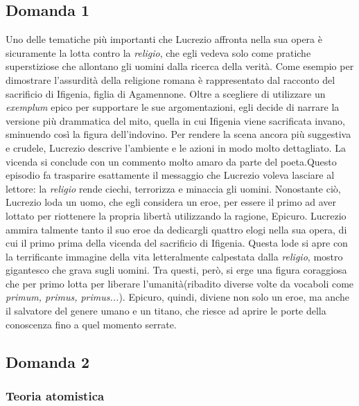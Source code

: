\documentclass[10pt,a4paper]{article}
\begin{document}
	\subsection{Domanda 1}
	
	Uno delle tematiche più importanti che Lucrezio affronta nella sua opera è sicuramente la lotta contro la \textit{religio}, che egli vedeva solo come pratiche superstiziose che allontano gli uomini dalla ricerca della verità. Come esempio per dimostrare l'assurdità della religione romana è rappresentato dal racconto del sacrificio di Ifigenia, figlia di Agamennone. 
	Oltre a scegliere di utilizzare un \textit{exemplum} epico per supportare le sue argomentazioni, egli decide di narrare la versione più drammatica del mito, quella in cui Ifigenia viene sacrificata invano, sminuendo così la figura dell'indovino. Per rendere la scena ancora più suggestiva e crudele, Lucrezio descrive l'ambiente e le azioni in modo molto dettagliato. La vicenda si conclude con un commento molto amaro da parte del poeta.Questo episodio fa trasparire esattamente il messaggio che Lucrezio voleva lasciare al lettore: la \textit{religio} rende ciechi, terrorizza e minaccia gli uomini. Nonostante ciò, Lucrezio loda un uomo, che egli considera un eroe, per essere il primo ad aver lottato per riottenere la propria libertà utilizzando la ragione, Epicuro. Lucrezio ammira talmente tanto il suo eroe da dedicargli quattro elogi nella sua opera, di cui il primo prima della vicenda del sacrificio di Ifigenia. Questa lode si apre con la terrificante immagine della vita letteralmente calpestata dalla \textit{religio}, mostro gigantesco che grava sugli uomini. Tra questi, però, si erge una figura coraggiosa che per primo lotta per liberare l'umanità(ribadito diverse volte da vocaboli come \textit{primum, primus, primus...}). Epicuro, quindi, diviene non solo un eroe, ma anche il salvatore del genere umano e un titano, che riesce ad aprire le porte della conoscenza fino a quel momento serrate.
	
	\subsection{Domanda 2}
	
	\subsubsection{Teoria atomistica}
	
\end{document}
